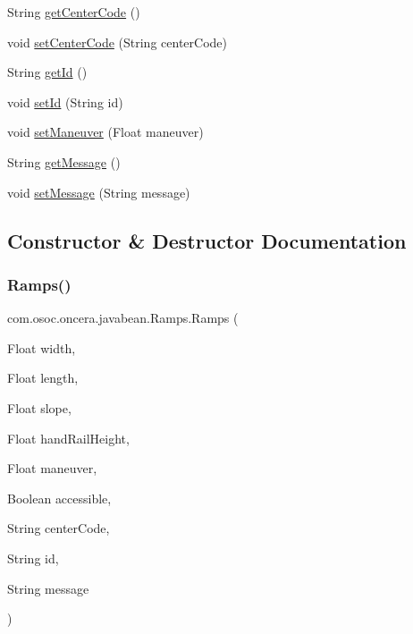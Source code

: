 \begin{DoxyCompactItemize}
\item 
String \mbox{\hyperlink{classcom_1_1osoc_1_1oncera_1_1javabean_1_1_ramps_a394dfc8eb38b59e1d367da9b88ca0549}{get\+Center\+Code}} ()
\item 
void \mbox{\hyperlink{classcom_1_1osoc_1_1oncera_1_1javabean_1_1_ramps_a733430174530b840ff90f81683db9e7c}{set\+Center\+Code}} (String center\+Code)
\item 
String \mbox{\hyperlink{classcom_1_1osoc_1_1oncera_1_1javabean_1_1_ramps_acfcc77fb0a27cea308cde8c1a5bcd96d}{get\+Id}} ()
\item 
void \mbox{\hyperlink{classcom_1_1osoc_1_1oncera_1_1javabean_1_1_ramps_a68e073f2172348eac38ecb5c3155e53f}{set\+Id}} (String id)
\item 
void \mbox{\hyperlink{classcom_1_1osoc_1_1oncera_1_1javabean_1_1_ramps_a4547bbf0244405466e6d393cc416c544}{set\+Maneuver}} (Float maneuver)
\item 
String \mbox{\hyperlink{classcom_1_1osoc_1_1oncera_1_1javabean_1_1_ramps_a53e9f20c94ba23234e813d314b46fb87}{get\+Message}} ()
\item 
void \mbox{\hyperlink{classcom_1_1osoc_1_1oncera_1_1javabean_1_1_ramps_ae5cca2e521ffb02310b7c9f1857e2cfe}{set\+Message}} (String message)
\end{DoxyCompactItemize}


\subsection{Constructor \& Destructor Documentation}
\mbox{\label{classcom_1_1osoc_1_1oncera_1_1javabean_1_1_ramps_a1418a3c1c5258fb48b397503233b1368}} 
\subsubsection{\texorpdfstring{Ramps()}{Ramps()}\hspace{0.1cm}{\footnotesize\ttfamily [1/2]}}
{\footnotesize\ttfamily com.\+osoc.\+oncera.\+javabean.\+Ramps.\+Ramps (\begin{DoxyParamCaption}\item[{Float}]{width,  }\item[{Float}]{length,  }\item[{Float}]{slope,  }\item[{Float}]{hand\+Rail\+Height,  }\item[{Float}]{maneuver,  }\item[{Boolean}]{accessible,  }\item[{String}]{center\+Code,  }\item[{String}]{id,  }\item[{String}]{message }\end{DoxyParamCaption})}

